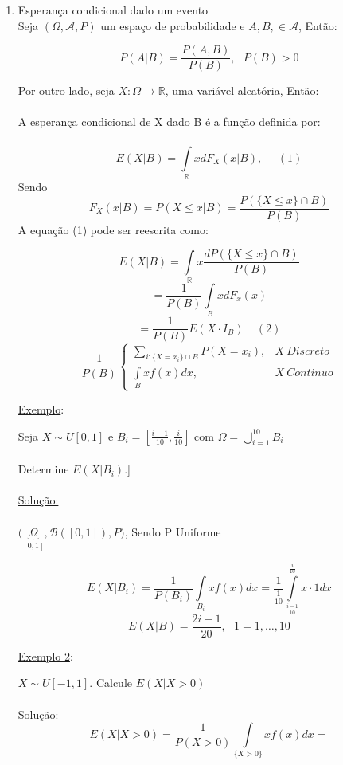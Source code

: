 \documentclass[a4paper,12pt]{article}
\begin{document}
\begin{enumerate}[label=\roman*)]
	\item Esperança condicional dado um evento\\
	Seja $(\Omega,\mathscr{A},P)$ um espaço de probabilidade e $A,B, \in \mathscr A$, Então:
	
	$$P(A|B)=\frac{P(A,B)}{P(B)}, \ \ \ P(B)>0$$
	
	Por outro lado, seja $X:\Omega \longrightarrow \mathbb R$, uma variável aleatória, Então:\\
	\\
	
	A esperança condicional de X dado B é a função definida por:\\
	\\
	$$E(X|B) = \int\limits_{\mathbb R} xdF_{X}(x|B), \ \ \ \ \ \ (1) $$
	Sendo 
	$$F_X(x|B) = P(X\le x|B) = \frac{P(\{ X\le x\}\cap B)}{P(B)}$$
	A equação (1) pode ser reescrita como:
	
	$$E(X|B) = \int\limits_{\mathbb R} x  \frac{dP(\{ X\le x\}\cap B)}{P(B)} $$
	$$=\frac{1}{P(B)}\int\limits_{B} xdF_x(x) $$
	$$= \frac{1}{P(B)}E(X\cdot I_B) \ \ \ \ \ (2) $$
	$$\frac{1}{P(B)}\begin{cases}
	\sum\limits_{i:\{X=x_i\}\cap B}P(X=x_i), & X \ Discreto\\
	\int\limits_B xf(x)dx, & X \ Continuo
	\end{cases} $$
	\newpage 
	
	\underline{Exemplo}:
	
Seja $X\sim U[0,1]$ e $B_i = [\frac{i-1}{10},\frac{i}{10}]$ com   $\Omega = \bigcup\limits_{i=1}^{10} B_i$\\
\\
Determine $E(X|B_i)$.]\\
\\
\underline{Solução:}\\
\\
$\bigg(\underbrace{\Omega}_{[0,1]},\mathscr B([0,1]),P\bigg)$, Sendo P Uniforme

$$E(X|B_i) = \frac{1}{P(B_i)} \int\limits_{B_i} xf(x)dx = \frac{1}{\frac{1}{10}}\int\limits_{\frac{i-1}{10}}^{\frac{i}{10}}x\cdot 1 dx $$
$$E(X|B) = \frac{2i-1}{20}, \ \ \ 1=1,\ldots,10 $$

\underline{Exemplo 2}:

$X\sim U[-1,1]$. Calcule $E(X|X>0)$\\
\\
\underline{Solução:}
$$E(X|X>0) = \frac{1}{P(X>0)} \int\limits_{\{X>0\}} xf(x)dx = $$


\end{enumerate}
\end{document}
